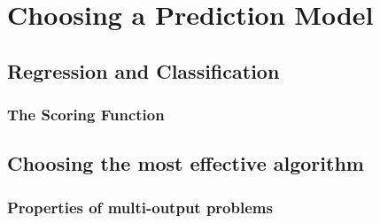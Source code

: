 \chapter{Choosing a Prediction Model}
\label{Prediction}

\section{Regression and Classification}

\subsection{The Scoring Function}

\section{Choosing the most effective algorithm}
\subsection{Properties of multi-output problems}

